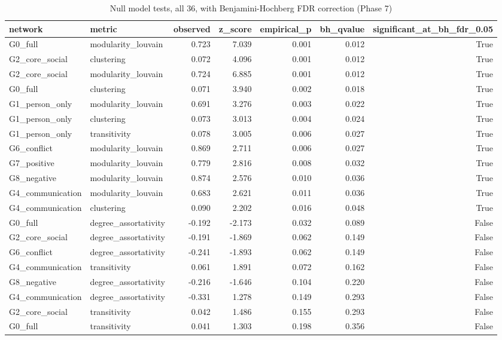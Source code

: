 \begin{table}
\caption{Null model tests, all 36, with Benjamini-Hochberg FDR correction (Phase 7)}
\label{tab:t09_null_model_tests}
\begin{tabular}{llrrrrr}
\toprule
network & metric & observed & z_score & empirical_p & bh_qvalue & significant_at_bh_fdr_0.05 \\
\midrule
G0_full & modularity_louvain & 0.723 & 7.039 & 0.001 & 0.012 & True \\
G2_core_social & clustering & 0.072 & 4.096 & 0.001 & 0.012 & True \\
G2_core_social & modularity_louvain & 0.724 & 6.885 & 0.001 & 0.012 & True \\
G0_full & clustering & 0.071 & 3.940 & 0.002 & 0.018 & True \\
G1_person_only & modularity_louvain & 0.691 & 3.276 & 0.003 & 0.022 & True \\
G1_person_only & clustering & 0.073 & 3.013 & 0.004 & 0.024 & True \\
G1_person_only & transitivity & 0.078 & 3.005 & 0.006 & 0.027 & True \\
G6_conflict & modularity_louvain & 0.869 & 2.711 & 0.006 & 0.027 & True \\
G7_positive & modularity_louvain & 0.779 & 2.816 & 0.008 & 0.032 & True \\
G8_negative & modularity_louvain & 0.874 & 2.576 & 0.010 & 0.036 & True \\
G4_communication & modularity_louvain & 0.683 & 2.621 & 0.011 & 0.036 & True \\
G4_communication & clustering & 0.090 & 2.202 & 0.016 & 0.048 & True \\
G0_full & degree_assortativity & -0.192 & -2.173 & 0.032 & 0.089 & False \\
G2_core_social & degree_assortativity & -0.191 & -1.869 & 0.062 & 0.149 & False \\
G6_conflict & degree_assortativity & -0.241 & -1.893 & 0.062 & 0.149 & False \\
G4_communication & transitivity & 0.061 & 1.891 & 0.072 & 0.162 & False \\
G8_negative & degree_assortativity & -0.216 & -1.646 & 0.104 & 0.220 & False \\
G4_communication & degree_assortativity & -0.331 & 1.278 & 0.149 & 0.293 & False \\
G2_core_social & transitivity & 0.042 & 1.486 & 0.155 & 0.293 & False \\
G0_full & transitivity & 0.041 & 1.303 & 0.198 & 0.356 & False \\

\end{tabular}
\end{table}
